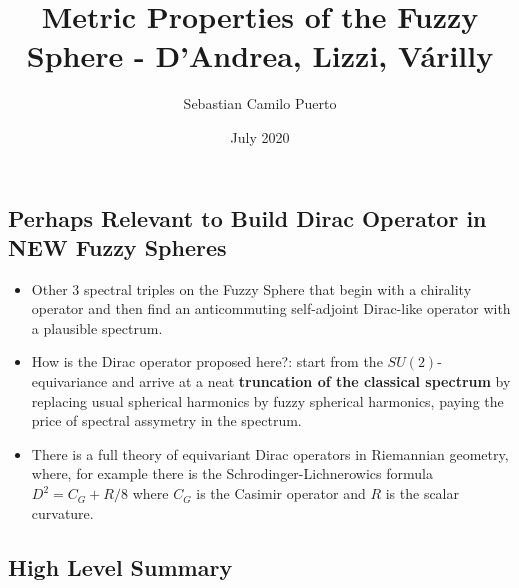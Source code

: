 \documentclass{article}
\title{Metric Properties of the Fuzzy Sphere - D'Andrea, Lizzi, V\'arilly}
\author{Sebastian Camilo Puerto}
\date{July 2020}
\begin{document}
\maketitle

\tableofcontents

\subsection{Perhaps Relevant to Build Dirac Operator in NEW Fuzzy Spheres}

    \begin{itemize}

    \item Other $3$ spectral triples on the Fuzzy Sphere that begin with a chirality operator and then find an anticommuting self-adjoint Dirac-like operator with a plausible spectrum.
    
    \item How is the Dirac operator proposed here?: start from the $SU(2)$-equivariance and arrive at a neat \textbf{truncation of the classical spectrum} by replacing usual spherical harmonics by fuzzy spherical harmonics, paying the price of spectral assymetry in the spectrum.
    
    \item There is a full theory of equivariant Dirac operators in Riemannian geometry, where, for example there is the Schrodinger-Lichnerowics formula $D^2 = C_G + R/8$ where $C_G$ is the Casimir operator and $R$ is the scalar curvature.
    
    \end{itemize}

\subsection{High Level Summary}
\end{document}
